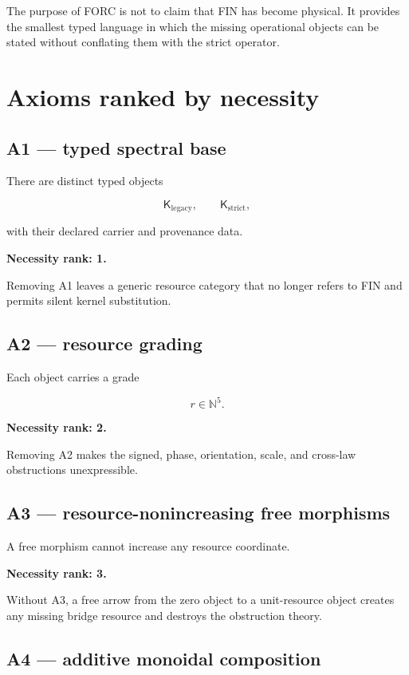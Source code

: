 \documentclass[11pt,a4paper,openany]{report}
\begin{document}
The purpose of FORC is not to claim that FIN has become physical. It provides the smallest typed language in which the missing operational objects can be stated without conflating them with the strict operator.

\section{Axioms ranked by necessity}

\subsection{A1 --- typed spectral base}

There are distinct typed objects

\[
\mathsf K_{\mathrm{legacy}},
\qquad
\mathsf K_{\mathrm{strict}},
\]

with their declared carrier and provenance data.

\textbf{Necessity rank: 1.}

Removing A1 leaves a generic resource category that no longer refers to FIN and permits silent kernel substitution.

\subsection{A2 --- resource grading}

Each object carries a grade

\[
r\in\mathbb N^5.
\]

\textbf{Necessity rank: 2.}

Removing A2 makes the signed, phase, orientation, scale, and cross-law obstructions unexpressible.

\subsection{A3 --- resource-nonincreasing free morphisms}

A free morphism cannot increase any resource coordinate.

\textbf{Necessity rank: 3.}

Without A3, a free arrow from the zero object to a unit-resource object creates any missing bridge resource and destroys the obstruction theory.

\subsection{A4 --- additive monoidal composition}
\end{document}
